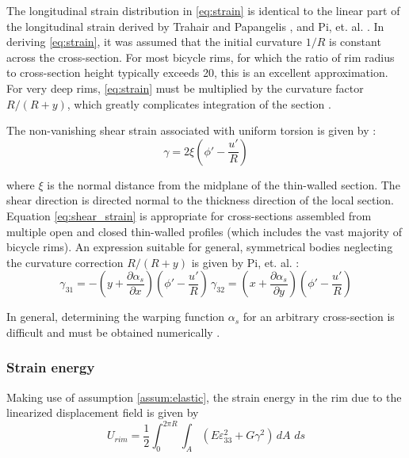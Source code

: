 \documentclass[\rootdir/thesis.tex]{subfiles}
\begin{document}
The longitudinal strain distribution in \eqref{eq:strain} is identical to the linear part of the longitudinal strain derived by Trahair and Papangelis \cite{Trahair1987}, and Pi, et. al. \cite{Pi1995}. In deriving \eqref{eq:strain}, it was assumed that the initial curvature $1/R$ is constant across the cross-section. For most bicycle rims, for which the ratio of rim radius to cross-section height typically exceeds 20, this is an excellent approximation. For very deep rims, \eqref{eq:strain} must be multiplied by the curvature factor $R/(R+y)$, which greatly complicates integration of the section \cite{Kang1994,Lim2004,Ryu2012}.

The non-vanishing shear strain associated with uniform torsion is given by \cite{Timoshenko,Pi1995,Kang2004}:
\begin{equation}
\label{eq:shear_strain}
\gamma = 2 \xi \left(\phi' - \frac{u'}{R}\right)
\end{equation}

where $\xi$ is the normal distance from the midplane of the thin-walled section. The shear direction is directed normal to the thickness direction of the local section. Equation \eqref{eq:shear_strain} is appropriate for cross-sections assembled from multiple open and closed thin-walled profiles (which includes the vast majority of bicycle rims). An expression suitable for general, symmetrical bodies neglecting the curvature correction $R/(R+y)$ is given by Pi, et. al. \cite{Pi2006}:
\begin{equation}
\gamma_{31} = -\left(y + \frac{\partial \alpha_s}{\partial x}\right)\left(\phi' - \frac{u'}{R}\right)\,
\gamma_{32} = \left(x + \frac{\partial \alpha_s}{\partial y}\right)\left(\phi' - \frac{u'}{R}\right)
\end{equation}

In general, determining the warping function $\alpha_s$ for an arbitrary cross-section is difficult and must be obtained numerically \cite{warping}.


\subsubsection{Strain energy}
Making use of assumption \ref{assum:elastic}, the strain energy in the rim due to the linearized displacement field is given by
\begin{equation}
\label{eq:U_rim_gen}
U_{rim} = \frac{1}{2}\int_0^{2\pi R} \int_A (E\varepsilon_{33}^2 + G\gamma^2) \,dA\,\, ds
\end{equation}
\end{document}
